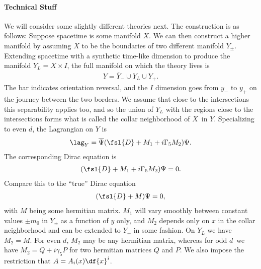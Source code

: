 \paragraph{Technical Stuff}
We will consider some slightly different theories next. The construction is as follows: Suppose spacetime is some manifold $X$. We can then construct a higher manifold by assuming $X$ to be the boundaries of two different manifold $Y_{\pm}$. Extending spacetime with a synthetic time-like dimension to produce the manifold $Y_{L} = X\times I$, the full manifold on which the theory lives is
\begin{align*}
	Y = \overline{Y}_{-}\cup Y_{L}\cup Y_{+}.
\end{align*}
The bar indicates orientation reversal, and the $I$ dimension goes from $y_{-}$ to $y_{+}$ on the journey between the two borders. We assume that close to the intersections this separability applies too, and so the union of $Y_{L}$ with the regions close to the intersections forms what is called the collar neighborhood of $X$ in $Y$. Specializing to even $d$, the Lagrangian on $Y$ is
\begin{align*}
	\lag_{Y} = \overline{\Psi}(\fsl{D} + M_{1} + i\Gamma_{5}M_{2})\Psi.
\end{align*}
The corresponding Dirac equation is
\begin{align*}
	(\fsl{D} + M_{1} + i\Gamma_{5}M_{2})\Psi = 0.
\end{align*}
Compare this to the ``true'' Dirac equation
\begin{align*}
	(\fsl{D} + M)\Psi = 0,
\end{align*}
with $M$ being some hermitian matrix. $M_{1}$ will vary smoothly between constant values $\pm m_{0}$ in $Y_{\pm}$ as a function of $y$ only, and $M_{2}$ depends only on $x$ in the collar neighborhood and can be extended to $Y_{\pm}$ in some fashion. On $Y_{L}$ we have $M_{2} = M$. For even $d$, $M_{2}$ may be any hermitian matrix, whereas for odd $d$ we have $M_{2} = Q + i\gamma_{5}P$ for two hermitian matrices $Q$ and $P$. We also impose the restriction that $A = A_{i}(x)\df{x}^{i}$.

